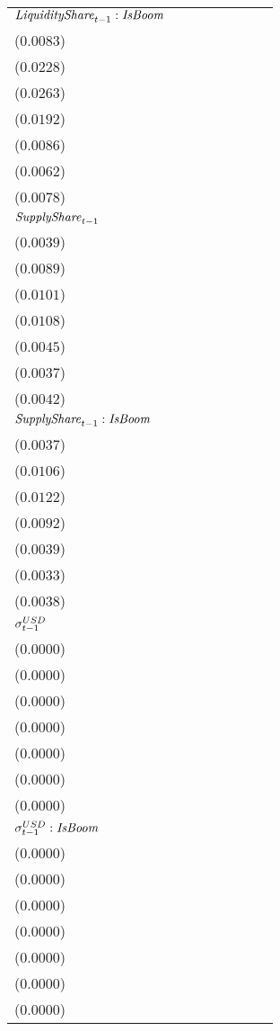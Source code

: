 \begin{tabular}{llllllll}
${\it LiquidityShare}_{t-1}:{\it IsBoom}$ & \makecell{$-0.0003^{}$ \\ ($0.0083$)} & \makecell{$0.0344^{}$ \\ ($0.0228$)} & \makecell{$0.0369^{}$ \\ ($0.0263$)} & \makecell{$0.0254^{}$ \\ ($0.0192$)} & \makecell{$0.0207^{**}$ \\ ($0.0086$)} & \makecell{$0.0112^{*}$ \\ ($0.0062$)} & \makecell{$0.0039^{}$ \\ ($0.0078$)} \\
${\it SupplyShare}_{t-1}$ & \makecell{$0.0179^{***}$ \\ ($0.0039$)} & \makecell{$0.0386^{***}$ \\ ($0.0089$)} & \makecell{$0.0378^{***}$ \\ ($0.0101$)} & \makecell{$0.0457^{***}$ \\ ($0.0108$)} & \makecell{$0.0091^{**}$ \\ ($0.0045$)} & \makecell{$0.0041^{}$ \\ ($0.0037$)} & \makecell{$0.0215^{***}$ \\ ($0.0042$)} \\
${\it SupplyShare}_{t-1}:{\it IsBoom}$ & \makecell{$-0.0059^{}$ \\ ($0.0037$)} & \makecell{$-0.0063^{}$ \\ ($0.0106$)} & \makecell{$-0.0020^{}$ \\ ($0.0122$)} & \makecell{$-0.0251^{***}$ \\ ($0.0092$)} & \makecell{$-0.0034^{}$ \\ ($0.0039$)} & \makecell{$-0.0011^{}$ \\ ($0.0033$)} & \makecell{$-0.0081^{**}$ \\ ($0.0038$)} \\
${\it \sigma}^{USD}_{t-1}$ & \makecell{$-0.0000^{}$ \\ ($0.0000$)} & \makecell{$-0.0000^{}$ \\ ($0.0000$)} & \makecell{$-0.0000^{}$ \\ ($0.0000$)} & \makecell{$0.0000^{}$ \\ ($0.0000$)} & \makecell{$0.0000^{}$ \\ ($0.0000$)} & \makecell{$-0.0000^{}$ \\ ($0.0000$)} & \makecell{$-0.0000^{}$ \\ ($0.0000$)} \\
${\it \sigma}^{USD}_{t-1}:{\it IsBoom}$ & \makecell{$0.0000^{***}$ \\ ($0.0000$)} & \makecell{$0.0000^{***}$ \\ ($0.0000$)} & \makecell{$0.0000^{***}$ \\ ($0.0000$)} & \makecell{$-0.0000^{***}$ \\ ($0.0000$)} & \makecell{$-0.0000^{***}$ \\ ($0.0000$)} & \makecell{$-0.0000^{***}$ \\ ($0.0000$)} & \makecell{$0.0000^{***}$ \\ ($0.0000$)} \\

\end{tabular}

